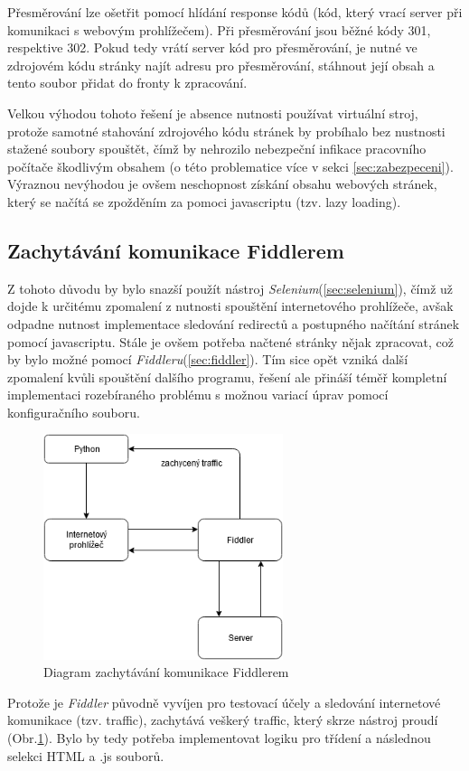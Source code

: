 \documentclass[thesis=M,czech,hidelinks]{FITthesis}[2013/05/06]
\begin{document}
Přesměrování lze ošetřit pomocí hlídání response kódů (kód, který vrací server při komunikaci s webovým prohlížečem). Při přesměrování jsou běžné kódy 301, respektive 302. Pokud tedy vrátí server kód pro přesměrování, je nutné ve zdrojovém kódu stránky najít adresu pro přesměrování, stáhnout její obsah a tento soubor přidat do fronty k zpracování.

Velkou výhodou tohoto řešení je absence nutnosti používat virtuální stroj, protože samotné stahování zdrojového kódu stránek by probíhalo bez nustnosti stažené soubory spouštět, čímž by nehrozilo nebezpeční infikace pracovního počítače škodlivým obsahem (o této problematice více v sekci \ref{sec:zabezpeceni}). Výraznou nevýhodou je ovšem neschopnost získání obsahu webových stránek, který se načítá se zpožděním za pomoci javascriptu (tzv. lazy loading).

\subsection{Zachytávání komunikace Fiddlerem}
Z tohoto důvodu by bylo snazší použít nástroj \textit{Selenium}(\ref{sec:selenium}), čímž už dojde k určitému zpomalení z nutnosti spouštění internetového prohlížeče, avšak odpadne nutnost implementace sledování redirectů a postupného načítání stránek pomocí javascriptu. Stále je ovšem potřeba načtené stránky nějak zpracovat, což by bylo možné pomocí \textit{Fiddleru}(\ref{sec:fiddler}). Tím sice opět vzniká další zpomalení kvůli spouštění dalšího programu, řešení ale přináší téměř kompletní implementaci rozebíraného problému s možnou variací úprav pomocí konfiguračního souboru.
\begin{figure}[h]
	\centering
	\includegraphics[width=7cm]{pictures/fiddler_diagram.png}
	\caption{Diagram zachytávání komunikace Fiddlerem}
	\label{fig:fiddler}
\end{figure}
Protože je \textit{Fiddler} původně vyvíjen pro testovací účely a sledování internetové komunikace (tzv. traffic), zachytává veškerý traffic, který skrze nástroj proudí (Obr.\ref{fig:fiddler}). Bylo by tedy potřeba implementovat logiku pro třídení a následnou selekci HTML a .js souborů.
\end{document}
